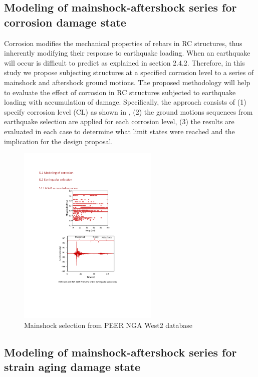 \subsection{Modeling of mainshock-aftershock series for corrosion damage state}
Corrosion modifies the mechanical properties of rebars in RC structures, thus inherently modifying their response to earthquake loading. When an earthquake will occur is difficult to predict as explained in section 2.4.2. Therefore, in this study we propose subjecting structures at a specified corrosion level to a series of mainshock and aftershock ground motions. The proposed methodology will help to evaluate the effect of corrosion in RC structures subjected to earthquake loading with accumulation of damage. 
Specifically, the approach consists of (1) specify corrosion level (CL) as shown in , (2) the ground motions sequences from earthquake selection are applied for each corrosion level, (3) the results are evaluated in each case to determine what limit states were reached and the implication for the design proposal. 

\begin{figure}[htbp]
	\centering
	\includegraphics[width=0.6\textwidth]{Chapter-5/figs/MS_AS_Figure.pdf}
	\caption{Mainshock selection from PEER NGA West2 database}
	\label{fig:MS_Selection}
\end{figure}

\subsection{Modeling of mainshock-aftershock series for strain aging damage state}

